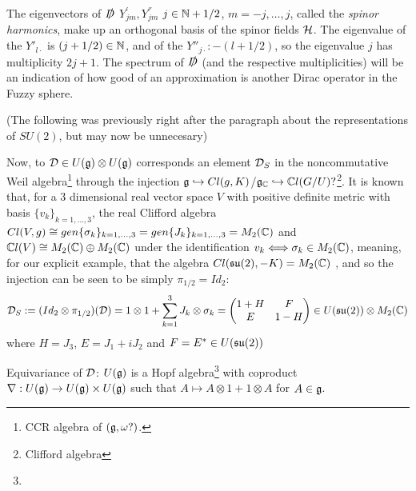 The eigenvectors of $\slashed D$ $Y^{'}_{jm}, Y^{''}_{jm}$ $j \in \mathbb{N} + 1/2$, $m = -j, \dots, j$, called the \textit{spinor harmonics}, make up an orthogonal basis of the spinor fields $\mathcal H$. The eigenvalue of the $Y'_{l\cdot}$ is $(j + 1/2) \in \mathbb{N}$, and of the $Y{''}_{j\cdot}: -(l + 1/2)$, so the eigenvalue $j$ has multiplicity $2j+1$. The spectrum of $\slashed D$ (and the respective multiplicities) will be an indication of how good of an approximation is another Dirac operator in the Fuzzy sphere. 


\linea

{\color{gray} (The following was previously right after the paragraph about the representations of $SU(2)$, but may now be unnecesary)

Now, to $\mathcal D \in U(\mathfrak{g}) \otimes U(\mathfrak{g})$ corresponds an element $\mathcal D_S$ in the noncommutative Weil algebra\footnote{CCR algebra of $(\mathfrak{g}, \omega?)$. } through the injection $\mathfrak{g} \hookrightarrow Cl(g, K)$/$\mathfrak{g}_{\mathbb{C}} \hookrightarrow \mathbb{C} l(G/U)?$\footnote{Clifford algebra}. It is known that, for a $3$ dimensional real vector space $V$ with positive definite metric with basis $\{v_k\}_{k = 1, \dots, 3}$, the real Clifford algebra $Cl(V, g) \cong gen\{\sigma_k\}_{k = 1, \dots, 3} = gen\{J_k\}_{k = 1, \dots, 3} = M_2(\mathbb{C})$ and $\mathbb{C} l(V) \cong M_2(\mathbb{C}) \oplus M_2(\mathbb{C})$ under the identification $v_k \Longleftrightarrow \sigma_k \in M_2(\mathbb{C})$, meaning, for our explicit example, that the algebra $Cl(\mathfrak{su}(2), -K) = M_2(\mathbb{C})$ 
, and so the injection can be seen to be simply $\pi_{1/2} = Id_2$:
\begin{equation}
    \mathcal D_S := (Id_2 \otimes \pi_{1/2})(\mathcal D) = 1 \otimes 1 + \sum_{k = 1}^3 J_k \otimes \sigma_k = \begin{pmatrix} 1 + H & F \\ E & 1 - H \end{pmatrix} \in U(\mathfrak{su}(2))\otimes M_2(\mathbb{C})
\end{equation}
where $H = J_3$, $E = J_1 + iJ_2$ and $F = E^* \in U(\mathfrak{su}(2))$


Equivariance of $\mathcal D$: $U(\mathfrak{g})$ is a Hopf algebra\footnote{} with coproduct $\nabla: U(\mathfrak{g}) \to U(\mathfrak{g}) \times U(\mathfrak{g})$ such that $A \mapsto A \otimes 1 + 1 \otimes A$ for $A \in \mathfrak{g}$.}

